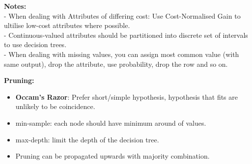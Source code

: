 \documentclass[10pt,landscape]{article}
\begin{document}
\begin{multicols}{3}
\begin{scriptsize}
\textbf{Notes:}\\
- When dealing with Attributes of differing cost: Use Cost-Normalised Gain to ultilise low-cost attributes where possible.\\
- Continuous-valued attributes should be partitioned into discrete set of intervals to use decision trees.\\
- When dealing with missing values, you can assign most common value (with same output), drop the attribute, use probability, drop the row and so on.

\textbf{Pruning:}\\
\begin{itemize}
  \item \textbf{Occam's Razor}: Prefer short/simple hypothesis, hypothesis that fits are unlikely to be coincidence.
  \item min-sample: each node should have minimum around of values.
  \item max-depth: limit the depth of the decision tree.
  \item Pruning can be propagated upwards with majority combination.
\end{itemize}


\end{scriptsize}

\end{multicols}
\end{document}
